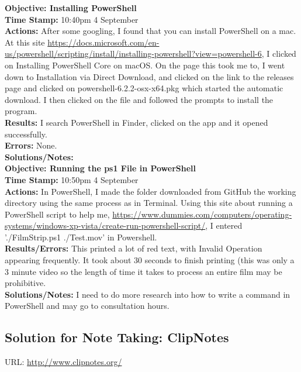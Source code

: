 \documentclass{article}
\begin{document}
\textbf{Objective: Installing PowerShell}\\
\textbf{Time Stamp:} 10:40pm 4 September\\
\textbf{Actions:} After some googling, I found that you can install PowerShell on a mac. At this site \url{https://docs.microsoft.com/en-us/powershell/scripting/install/installing-powershell?view=powershell-6}, I clicked on Installing PowerShell Core on macOS. On the page this took me to, I went down to Installation via Direct Download, and clicked on the link to the releases page and clicked on powershell-6.2.2-osx-x64.pkg which started the automatic download. I then clicked on the file and followed the prompts to install the program.\\
\textbf{Results:} I search PowerShell in Finder, clicked on the app and it opened successfully.\\
\textbf{Errors:} None.\\
\textbf{Solutions/Notes:} \\

\textbf{Objective: Running the ps1 File in PowerShell}\\
\textbf{Time Stamp:} 10:50pm 4 September\\
\textbf{Actions:} In PowerShell, I made the folder downloaded from GitHub the working directory using the same process as in Terminal. Using this site about running a PowerShell script to help me, \url{https://www.dummies.com/computers/operating-systems/windows-xp-vista/create-run-powershell-script/}, I entered './FilmStrip.ps1 ./Test.mov' in Powershell. \\
\textbf{Results/Errors:} This printed a lot of red text, with Invalid Operation appearing frequently. It took about 30 seconds to finish printing (this was only a 3 minute video so the length of time it takes to process an entire film may be prohibitive.\\
\textbf{Solutions/Notes:} I need to do more research into how to write a command in PowerShell and may go to consultation hours.\\

\subsection{Solution for Note Taking: ClipNotes}
URL: \url{http://www.clipnotes.org/}\\
\end{document}
